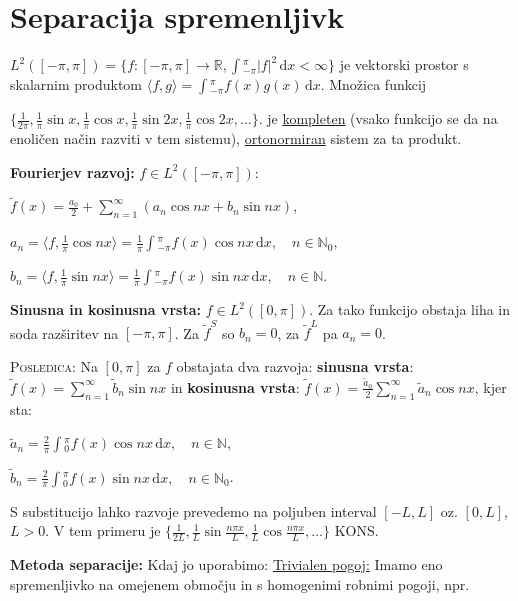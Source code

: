 \documentclass[10pt,a4paper]{amsart}
\theoremstyle{definition} %
\theoremstyle{plain} %
\newcommand{\dx}{\ensuremath{\,\mathrm{d}x}}
\let\oldint\int
\renewcommand{\int}{\oldint \!}
\newcommand{\R}{\mathbb R}
\newcommand{\N}{\mathbb N}
\begin{document}



\section*{Separacija spremenljivk}

$L^2([-\pi,\pi]) = \{f:[-\pi,\pi]\longrightarrow \R, \int_{-\pi}^\pi |f|^2
\dx < \infty \}$ je vektorski prostor s skalarnim produktom $\langle f, g\rangle =
\int_{-\pi}^\pi f(x)g(x)\dx$. Množica funkcij

  $\{\frac{1}{2\pi},
  \frac{1}{\pi}\sin{x},\frac{1}{\pi}\cos{x},\frac{1}{\pi}\sin{2x},\frac{1}{\pi}\cos{2x},\ldots
\}$. je \underline{kompleten} (vsako funkcijo se da na enoličen način razviti v
tem sistemu),  \underline{ortonormiran} sistem za ta produkt.

\textbf{Fourierjev razvoj:} $f \in L^2([-\pi,\pi])$:

$\tilde{f}(x) = \frac{a_0}{2} + \sum_{n=1}^{\infty}(a_n\cos{nx} + b_n\sin{nx})$,

$a_n = \langle f,\frac{1}{\pi}\cos{nx} \rangle =
\frac{1}{\pi}\int_{-\pi}^{\pi}f(x)\cos{nx}\dx, \quad n \in \N_0$,

$b_n = \langle f,\frac{1}{\pi}\sin{nx} \rangle =
\frac{1}{\pi}\int_{-\pi}^{\pi}f(x)\sin{nx}\dx, \quad n \in \N$.

\textbf{Sinusna in kosinusna vrsta:} $f \in L^2([0,\pi])$. Za tako funkcijo
obstaja liha in soda razširitev na $[-\pi,\pi]$. Za $\tilde{f}^S$ so $b_n = 0$,
za $\tilde{f}^L$ pa $a_n = 0$.

\textsc{Posledica:} Na $[0,\pi]$ za $f$ obstajata dva razvoja: \textbf{sinusna
vrsta}: $\tilde{f}(x) =  \sum_{n=1}^{\infty} \tilde{b}_n\sin{nx}$ in
\textbf{kosinusna vrsta}:  $\tilde{f}(x) =
\frac{\tilde{a}_0}{2}\sum_{n=1}^{\infty}\tilde{a}_n\cos{nx}$, kjer sta:

$\tilde{a}_n = \frac{2}{\pi}\int_0^{\pi}f(x)\cos{nx}\dx, \quad n \in \N$,

$\tilde{b}_n = \frac{2}{\pi}\int_0^{\pi}f(x)\sin{nx}\dx, \quad n \in \N_0$.

S substitucijo lahko razvoje prevedemo na poljuben interval $[-L,L]$ oz.
$[0,L]$, $L > 0$. V tem primeru je $\{\frac{1}{2L}, \frac{1}{L}\sin{\frac{n\pi
x}{L}},\frac{1}{L}\cos{\frac{n\pi x}{L}},\ldots \}$ KONS.


\textbf{Metoda separacije:} Kdaj jo uporabimo: \underline{Trivialen pogoj:}
Imamo eno spremenljivko na omejenem območju in s homogenimi robnimi pogoji, npr.
\end{document}
